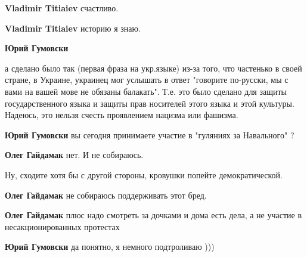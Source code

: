 \begin{itemize}
\begin{itemize}
\textbf{Vladimir Titiaiev} счастливо.


\textbf{Vladimir Titiaiev} историю я знаю.


\textbf{Юрий Гумовски} 

а сделано было так (первая фраза на укр.языке) из-за того, что частенько в
своей стране, в Украине, украинец мог услышать в ответ "говорите по-русски, мы
с вами на вашей мове не обязаны балакать". Т.е. это было сделано для защиты
государственного языка и защиты прав носителей этого языка и этой культуры.
Надеюсь, это нельзя счесть проявлением нацизма или фашизма.



\textbf{Юрий Гумовски} вы сегодня принимаете участие в "гуляниях за Навального" ?


\textbf{Олег Гайдамак} нет. И не собираюсь.


Ну, сходите хотя бы с другой стороны, кровушки попейте демократической.


\textbf{Олег Гайдамак} не собираюсь поддерживать этот бред.


\textbf{Олег Гайдамак} плюс надо смотреть за дочками и дома есть дела, а не участие в несакционированных протестах


\textbf{Юрий Гумовски} да понятно, я немного подтроливаю )))


\end{itemize}
\end{itemize}

